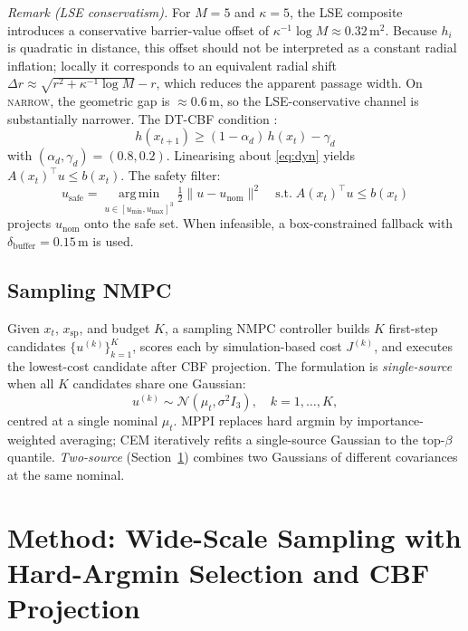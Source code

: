 \documentclass[11pt,onecolumn,a4paper]{article}
\newcommand{\spt}{\mathrm{sp}}
\newcommand{\nom}{\mathrm{nom}}
\newcommand{\safe}{\mathrm{safe}}
\begin{document}
\emph{Remark (LSE conservatism).}
For $M = 5$ and $\kappa = 5$, the LSE composite introduces a
conservative barrier-value offset of $\kappa^{-1}\log M \approx
0.32$\,m$^2$. Because $h_i$ is quadratic in distance, this offset
should not be interpreted as a constant radial inflation; locally
it corresponds to an equivalent radial shift $\Delta r \approx
\sqrt{r^2 + \kappa^{-1}\log M} - r$, which reduces the apparent
passage width. On \textsc{narrow}, the geometric gap is
${\approx}0.6\,\mathrm{m}$, so the LSE-conservative channel is
substantially narrower.
The DT-CBF condition \cite{WAN17,AME17}:
\begin{equation}\label{eq:dt-ccbf}
h(x_{t+1}) \ge (1 - \alpha_d)\, h(x_t) - \gamma_d
\end{equation}
with $(\alpha_d, \gamma_d) = (0.8, 0.2)$. Linearising about
\eqref{eq:dyn} yields $A(x_t)^\top u \le b(x_t)$. The safety filter:
\begin{equation}\label{eq:qp}
u_\safe = \operatorname*{arg\,min}_{u \in [u_{\min}, u_{\max}]^3}
\tfrac{1}{2} \|u - u_\nom\|^2
\quad \text{s.t.}\; A(x_t)^\top u \le b(x_t)
\end{equation}
projects $u_\nom$ onto the safe set. When infeasible, a box-constrained
fallback with $\delta_{\mathrm{buffer}} = 0.15\,\mathrm{m}$ is used.

\subsection{Sampling NMPC}

Given $x_t$, $x_\spt$, and budget $K$, a sampling NMPC controller
builds $K$ first-step candidates $\{u^{(k)}\}_{k=1}^{K}$, scores each
by simulation-based cost $J^{(k)}$, and executes the lowest-cost
candidate after CBF projection. The formulation is
\emph{single-source} when all $K$ candidates share one Gaussian:
\begin{equation}\label{eq:single}
u^{(k)} \sim \mathcal{N}(\mu_t, \sigma^2 I_3),\quad k = 1,\dots,K,
\end{equation}
centred at a single nominal $\mu_t$. MPPI \cite{WIL17} replaces hard
argmin by importance-weighted averaging; CEM \cite{BOT13} iteratively
refits a single-source Gaussian to the top-$\beta$ quantile.
\emph{Two-source} (Section~\ref{sec:method}) combines two Gaussians of
different covariances at the same nominal.

\section{Method: Wide-Scale Sampling with Hard-Argmin Selection and CBF Projection}\label{sec:method}
\end{document}

